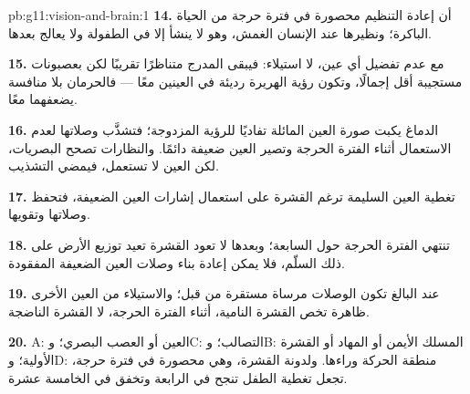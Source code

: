 \begin{solution}{pb:g11:vision-and-brain:1}
\textbf{14.} أن إعادة التنظيم محصورة في فترة حرجة من الحياة الباكرة؛
ونظيرها عند الإنسان الغمش، وهو لا ينشأ إلا في الطفولة ولا يعالج بعدها.

\textbf{15.} مع عدم تفضيل أي عين، لا استيلاء: فيبقى المدرج متناظرًا
تقريبًا لكن بعصبونات مستجيبة أقل إجمالًا، وتكون رؤية الهريرة رديئة في
العينين معًا --- فالحرمان بلا منافسة يضعفهما معًا.

\textbf{16.} الدماغ يكبت صورة العين المائلة تفاديًا للرؤية المزدوجة؛
فتشذَّب وصلاتها لعدم الاستعمال أثناء الفترة الحرجة وتصير العين ضعيفة
دائمًا. والنظارات تصحح البصريات، لكن العين لا تستعمل، فيمضي التشذيب.

\textbf{17.} تغطية العين السليمة ترغم القشرة على استعمال إشارات العين
الضعيفة، فتحفظ وصلاتها وتقويها.

\textbf{18.} تنتهي الفترة الحرجة حول السابعة؛ وبعدها لا تعود القشرة
تعيد توزيع الأرض على ذلك السلّم، فلا يمكن إعادة بناء وصلات العين
الضعيفة المفقودة.

\textbf{19.} عند البالغ تكون الوصلات مرساة مستقرة من قبل؛ والاستيلاء
من العين الأخرى ظاهرة تخص القشرة النامية، أثناء الفترة الحرجة، لا
القشرة الناضجة.

\textbf{20.} A: العين أو العصب البصري؛ وC: التصالب؛ وB: المسلك الأيمن
أو المهاد أو القشرة الأولية؛ وD: منطقة الحركة وراءها. ولدونة القشرة،
وهي محصورة في فترة حرجة، تجعل تغطية الطفل تنجح في الرابعة وتخفق في
الخامسة عشرة.
\end{solution}
